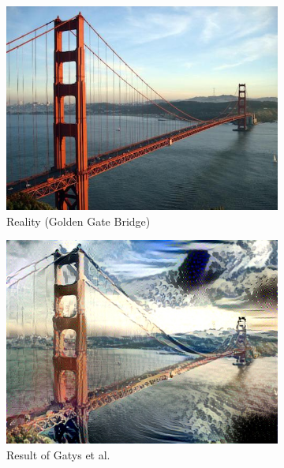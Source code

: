 \documentclass[10pt,twocolumn,letterpaper]{article}
\begin{document}
\begin{figure}[!h]
  \centering
  \begin{subfigure}[b]{0.33\textwidth}
    \includegraphics[width=\textwidth]{figure/contentgoldbridge.jpg}
    \caption{Reality (Golden Gate Bridge)}
    \label{fig::goldreal}
  \end{subfigure}
  \begin{subfigure}[b]{0.33\textwidth}
    \includegraphics[width=\textwidth]{figure/stdgoldbridge.jpg}
    \caption{Result of Gatys et al.}
    \label{fig::goldgatys}
  \end{subfigure}
  \begin{subfigure}[b]{0.33\textwidth}

\end{subfigure}
\end{figure}
\end{document}
